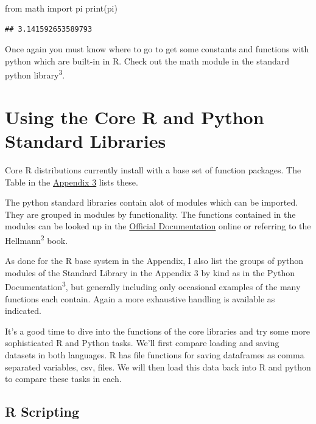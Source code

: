 \documentclass[]{book}
\newenvironment{Shaded}{\begin{snugshade}}{\end{snugshade}}
\newcommand{\ImportTok}[1]{#1}
\newcommand{\BuiltInTok}[1]{#1}
\newcommand{\NormalTok}[1]{#1}
\theoremstyle{definition}
\theoremstyle{definition}
\theoremstyle{definition}
\theoremstyle{remark}
\begin{document}
\begin{Shaded}
\begin{Highlighting}[]
\ImportTok{from}\NormalTok{ math }\ImportTok{import}\NormalTok{ pi}
\BuiltInTok{print}\NormalTok{(pi)}
\end{Highlighting}
\end{Shaded}

\begin{verbatim}
## 3.141592653589793
\end{verbatim}

Once again you must know where to go to get some constants and functions
with python which are built-in in R. Check out the math module
 in the standard python library\textsuperscript{3}.

\section{Using the Core R and Python Standard
Libraries}\label{using-the-core-r-and-python-standard-libraries}

 Core R distributions currently install with a base set of
function packages. The Table in the
\href{17-Appendix_3_Packages.Rmd}{Appendix 3} lists these.

The python standard libraries contain alot of modules which can be
imported. They are grouped in modules by functionality. The functions
contained in the modules can be looked up in the
\href{https://docs.python.org/3.7/}{Official Documentation} online or
referring to the Hellmann\textsuperscript{2} book.

As done for the R base system in the Appendix, I also list the groups of
python modules of the Standard Library in the Appendix 3 by kind as in
the Python Documentation\textsuperscript{3}, but generally including
only occasional examples of the many functions each contain. Again a
more exhaustive handling is available as indicated.

It's a good time to dive into the functions of the core libraries and
try some more sophisticated R and Python tasks. We'll first compare
loading and saving datasets in both languages. R has file functions for
saving dataframes as comma separated variables, csv, files. We will then
load this data back into R and python to compare these tasks in each.

\subsection{R Scripting}\label{r-scripting-3}
\end{document}
